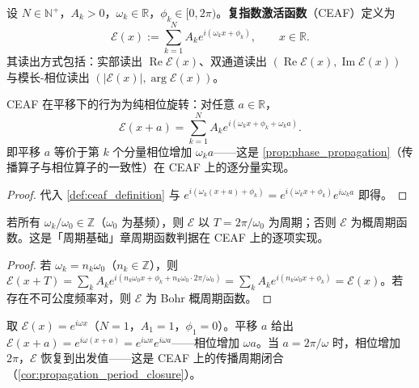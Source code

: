 \begin{definition}[复指数激活函数]\label{def:ceaf_definition}
设 $N\in\mathbb{N}^+$，$A_k>0$，$\omega_k\in\mathbb{R}$，$\phi_k\in[0,2\pi)$。\textbf{复指数激活函数}（CEAF）定义为
\[
\mathcal{E}(x) := \sum_{k=1}^{N}A_k e^{i(\omega_k x+\phi_k)}, \qquad x\in\mathbb{R}.
\]
其读出方式包括：实部读出 $\operatorname{Re}\mathcal{E}(x)$、双通道读出 $(\operatorname{Re}\mathcal{E}(x),\operatorname{Im}\mathcal{E}(x))$ 与模长-相位读出 $(|\mathcal{E}(x)|, \arg\mathcal{E}(x))$。
\end{definition}

\begin{proposition}\label{prop:ceaf_phase_rotation}
CEAF 在平移下的行为为纯相位旋转：对任意 $a\in\mathbb{R}$，
\[
\mathcal{E}(x+a) = \sum_{k=1}^{N}A_k e^{i(\omega_k x+\phi_k+\omega_k a)}.
\]
即平移 $a$ 等价于第 $k$ 个分量相位增加 $\omega_k a$——这是 \cref{prop:phase_propagation}（传播算子与相位算子的一致性）在 CEAF 上的逐分量实现。
\end{proposition}

\begin{proof}
代入 \cref{def:ceaf_definition} 与 $e^{i(\omega_k(x+a)+\phi_k)} = e^{i(\omega_k x+\phi_k)}e^{i\omega_k a}$ 即得。
\end{proof}

\begin{corollary}\label{cor:ceaf_period}
若所有 $\omega_k/\omega_0\in\mathbb{Z}$（$\omega_0$ 为基频），则 $\mathcal{E}$ 以 $T = 2\pi/\omega_0$ 为周期；否则 $\mathcal{E}$ 为概周期函数。这是「周期基础」章周期函数判据在 CEAF 上的逐项实现。
\end{corollary}

\begin{proof}
若 $\omega_k = n_k\omega_0$（$n_k\in\mathbb{Z}$），则 $\mathcal{E}(x+T) = \sum_k A_k e^{i(n_k\omega_0 x+\phi_k+n_k\omega_0\cdot 2\pi/\omega_0)} = \sum_k A_k e^{i(n_k\omega_0 x+\phi_k)} = \mathcal{E}(x)$。若存在不可公度频率对，则 $\mathcal{E}$ 为 Bohr 概周期函数。
\end{proof}

\begin{example}\label{ex:single_ceaf_phase}
取 $\mathcal{E}(x) = e^{i\omega x}$（$N=1$，$A_1=1$，$\phi_1=0$）。平移 $a$ 给出 $\mathcal{E}(x+a) = e^{i\omega(x+a)} = e^{i\omega x}e^{i\omega a}$——相位增加 $\omega a$。当 $a = 2\pi/\omega$ 时，相位增加 $2\pi$，$\mathcal{E}$ 恢复到出发值——这是 CEAF 上的传播周期闭合（\cref{cor:propagation_period_closure}）。
\end{example}

